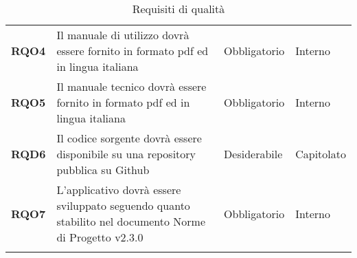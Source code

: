 \begin{longtable}[H]{| >{\raggedright\bfseries}m{20mm} | >{\raggedright}m{90mm} | >{\centering}m{25mm} | >{\centering\arraybackslash}m{30mm}|}
    RQO4
        & Il manuale di utilizzo dovrà essere fornito in formato pdf ed in lingua italiana
        & Obbligatorio
        & Interno \\

    RQO5
        & Il manuale tecnico dovrà essere fornito in formato pdf ed in lingua italiana
        & Obbligatorio
        & Interno \\

    RQD6
        & Il codice sorgente dovrà essere disponibile su una repository pubblica su Github
        & Desiderabile
        & Capitolato \\

    RQO7
        & L'applicativo dovrà essere sviluppato seguendo quanto stabilito nel documento Norme di Progetto v2.3.0
        & Obbligatorio
        & Interno \\
    \hline
    \rowcolor{white}
    \caption{Requisiti di qualità}%
    \label{tab:requisiti_di_qualita}
\end{longtable}
